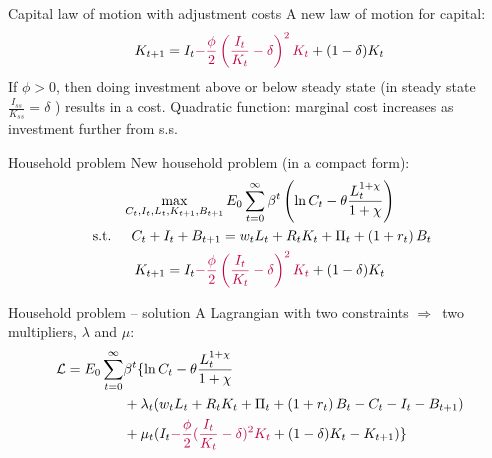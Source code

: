 \documentclass{beamer}
\newcommand{\rarr}{$\Rightarrow$\ }
\begin{document}
\begin{frame}{Capital law of motion with adjustment costs}
  A new law of motion for capital: 
$$
K_{t+1}=I_{t}\textcolor{purple}{-\frac{\phi}{2}\left(\frac{I_{t}}{K_{t}}-\delta\right)^{2} K_{t}}+(1-\delta) K_{t}
$$
If $\phi>0$, then doing investment above or below steady state (in steady state $\frac{I_{ss}}{K_{ss}}=\delta$ ) results in a cost. Quadratic function: marginal cost increases as investment further from s.s. 
\end{frame}

\begin{frame}{Household problem}
  New household problem (in a compact form):
  $$
\begin{gathered}
\max _{C_{t}, I_{t}, L_{t}, K_{t+1}, B_{t+1}} E_{0} \sum_{t=0}^{\infty} \beta^{t}\left(\ln C_{t}-\theta \frac{L_{t}^{1+\chi}}{1+\chi}\right) \\
\text { s.t. } \quad
C_{t}+I_{t}+B_{t+1} =  w_{t} L_{t}+R_{t} K_{t}+\Pi_{t}+\left(1+r_t\right) B_{t} \\
K_{t+1}=I_{t}\textcolor{purple}{-\frac{\phi}{2}\left(\frac{I_{t}}{K_{t}}-\delta\right)^{2} K_{t}}+(1-\delta) K_{t}
\end{gathered}
$$
\end{frame}

\begin{frame}{Household problem -- solution}
A Lagrangian with two constraints \rarr two multipliers, $\lambda$ and $\mu$:
\begin{align*}
\mathcal{L}=E_{0} \sum_{t=0}^{\infty} &\beta^{t}\{\ln C_{t}-\theta \frac{L_{t}^{1+\chi}}{1+\chi} \\
&+\lambda_{t}(w_{t} L_{t}+R_{t} K_{t}+\Pi_{t}+\left(1+r_t\right) B_{t}-C_{t}-I_{t}-B_{t+1}) \\
&+\mu_{t}(I_{t}\textcolor{purple}{-\frac{\phi}{2}(\frac{I_{t}}{K_{t}}-\delta)^{2} K_{t}}+(1-\delta) K_{t}-K_{t+1})\}
\end{align*}
\end{frame}
\end{document}
